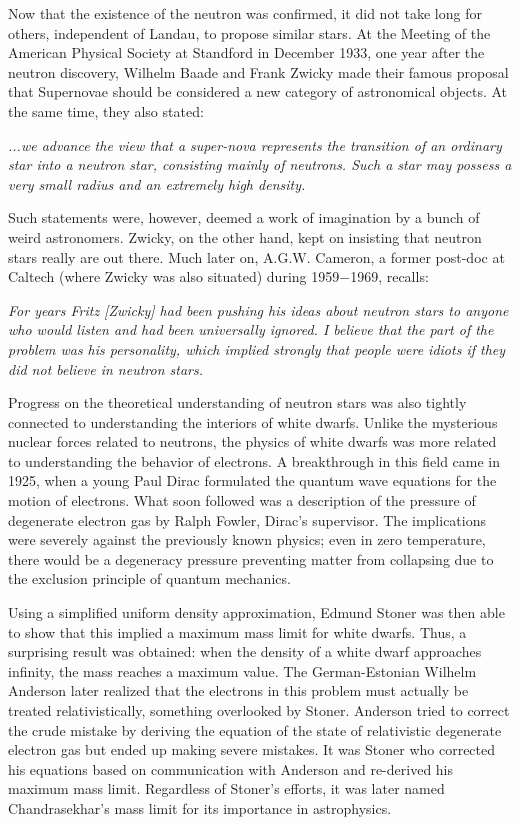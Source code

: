 Now that the existence of the neutron was confirmed, it did not take long for others, independent of Landau, to propose similar stars.
At the Meeting of the American Physical Society at Standford in December 1933, one year after the neutron discovery, Wilhelm Baade and Frank Zwicky made their famous proposal that Supernovae should be considered a new category of astronomical objects.\cite{Baade34a, Baade34aa}
At the same time, they also stated:
\begin{displayquote}
    \textit{...we advance the view that a super-nova represents the transition of an ordinary star into a neutron star, consisting mainly of neutrons. Such a star may possess a very small radius and an extremely high density.}
\end{displayquote}
Such statements were, however, deemed a work of imagination by a bunch of weird astronomers.
Zwicky, on the other hand, kept on insisting that neutron stars really are out there.
Much later on, A.G.W. Cameron, a former post-doc at Caltech (where Zwicky was also situated) during 1959$-$1969, recalls:
\begin{displayquote}[A.G.W. Cameron, 1999]
    \textit{For years Fritz [Zwicky] had been pushing his ideas about neutron stars to anyone who would listen and had been universally ignored. 
    I believe that the part of the problem was his personality, which implied strongly that people were idiots if they did not believe in neutron stars.
    }
\end{displayquote}


Progress on the theoretical understanding of neutron stars was also tightly connected to understanding the interiors of white dwarfs.
Unlike the mysterious nuclear forces related to neutrons, the physics of white dwarfs was more related to understanding the behavior of electrons.
A breakthrough in this field came in 1925, when a young Paul Dirac formulated the quantum wave equations for the motion of electrons\cite{Dirac25}.
What soon followed was a description of the pressure of degenerate electron gas by Ralph Fowler, Dirac's supervisor\cite{Fowler26}.
The implications were severely against the previously known physics;
even in zero temperature, there would be a degeneracy pressure preventing matter from collapsing due to the exclusion principle of quantum mechanics.

Using a simplified uniform density approximation, Edmund Stoner was then able to show that this implied a maximum mass limit for white dwarfs.\cite{Stoner30}
Thus, a surprising result was obtained: when the density of a white dwarf approaches infinity, the mass reaches a maximum value.
The German-Estonian Wilhelm Anderson later realized that the electrons in this problem must actually be treated relativistically\cite{Anderson29}, something overlooked by Stoner.
Anderson tried to correct the crude mistake by deriving the equation of the state of relativistic degenerate electron gas but ended up making severe mistakes.
It was Stoner who corrected his equations based on communication with Anderson and re-derived his maximum mass limit.
Regardless of Stoner's efforts, it was later named Chandrasekhar's mass limit for its importance in astrophysics.

